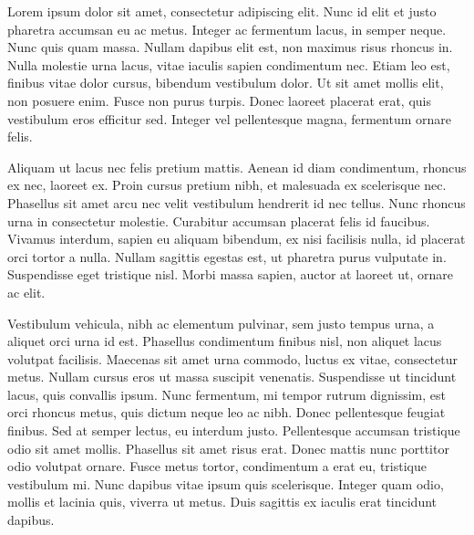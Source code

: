 \documentclass[11pt]{article}
\begin{document}
\grejustifiedlastline{}

Lorem ipsum dolor sit amet, consectetur adipiscing elit. Nunc id elit et justo
pharetra accumsan eu ac metus. Integer ac fermentum lacus, in semper neque.
Nunc quis quam massa. Nullam dapibus elit est, non maximus risus rhoncus in.
Nulla molestie urna lacus, vitae iaculis sapien condimentum nec. Etiam leo est,
finibus vitae dolor cursus, bibendum vestibulum dolor. Ut sit amet mollis elit,
non posuere enim. Fusce non purus turpis. Donec laoreet placerat erat, quis
vestibulum eros efficitur sed. Integer vel pellentesque magna, fermentum ornare
felis.

Aliquam ut lacus nec felis pretium mattis. Aenean id diam condimentum, rhoncus
ex nec, laoreet ex. Proin cursus pretium nibh, et malesuada ex scelerisque nec.
Phasellus sit amet arcu nec velit vestibulum hendrerit id nec tellus. Nunc
rhoncus urna in consectetur molestie. Curabitur accumsan placerat felis id
faucibus. Vivamus interdum, sapien eu aliquam bibendum, ex nisi facilisis
nulla, id placerat orci tortor a nulla. Nullam sagittis egestas est, ut
pharetra purus vulputate in. Suspendisse eget tristique nisl. Morbi massa
sapien, auctor at laoreet ut, ornare ac elit.

Vestibulum vehicula, nibh ac elementum pulvinar, sem justo tempus urna, a
aliquet orci urna id est. Phasellus condimentum finibus nisl, non aliquet lacus
volutpat facilisis. Maecenas sit amet urna commodo, luctus ex vitae,
consectetur metus. Nullam cursus eros ut massa suscipit venenatis. Suspendisse
ut tincidunt lacus, quis convallis ipsum. Nunc fermentum, mi tempor rutrum
dignissim, est orci rhoncus metus, quis dictum neque leo ac nibh. Donec
pellentesque feugiat finibus. Sed at semper lectus, eu interdum justo.
Pellentesque accumsan tristique odio sit amet mollis. Phasellus sit amet risus
erat. Donec mattis nunc porttitor odio volutpat ornare. Fusce metus tortor,
condimentum a erat eu, tristique vestibulum mi. Nunc dapibus vitae ipsum quis
scelerisque. Integer quam odio, mollis et lacinia quis, viverra ut metus. Duis
sagittis ex iaculis erat tincidunt dapibus.
\end{document}
